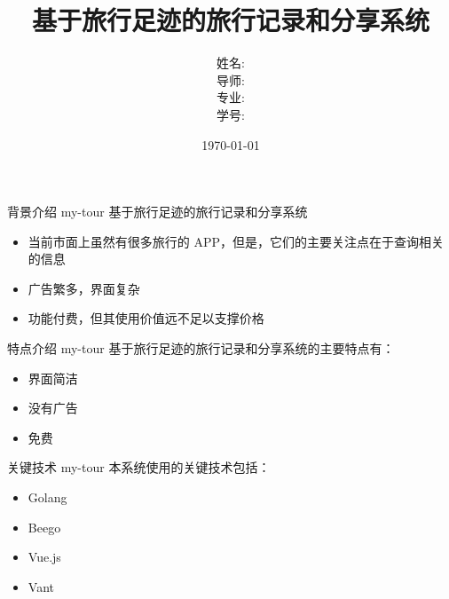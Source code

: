 \documentclass[14pt,notheorems]{beamer}
\newcommand{\mylead}[1]{\textcolor{acolor1}{#1}}
\begin{document}
\title{基于旅行足迹的旅行记录和分享系统}
\author[周翔辉]
{姓名: \\
  导师: \\
  专业: \\
  学号: }

\date{\today}

\begin{frame}[plain]\transboxout
\titlepage
\end{frame}


\begin{frame}{背景介绍}
  \mylead{my-tour} 基于旅行足迹的旅行记录和分享系统 \pause
\begin{itemize}[<+->]
\item 当前市面上虽然有很多旅行的 APP，但是，它们的主要关注点在于查询相关的信息
\item 广告繁多，界面复杂
\item 功能付费，但其使用价值远不足以支撑价格
\end{itemize}
\end{frame}

\begin{frame}{ 特点介绍 }
  \mylead{my-tour} 基于旅行足迹的旅行记录和分享系统的主要特点有： \pause
  \begin{itemize}[<+->]
    \item 界面简洁
    \item 没有广告
    \item 免费
  \end{itemize}

\end{frame}

\begin{frame}{关键技术}
  \mylead{my-tour} 本系统使用的关键技术包括：\pause
  \begin{itemize}[<+->]
    \item Golang
    \item Beego
    \item Vue.js
    \item Vant
  \end{itemize}

\end{frame}
\end{document}

